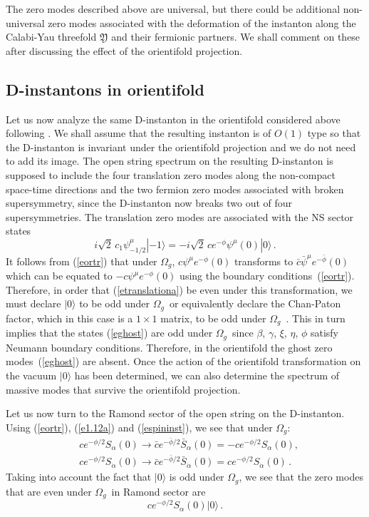 \documentclass[12pt,a4paper]{article}
\newcommand{\be}{\begin{equation}}
\newcommand{\ee}{\end{equation}}
\newcommand{\refb}[1]{(\ref{#1})}
\newcommand{\dalpha}{\beta}
\def\CY{\mathfrak{Y}}
\def\dalpha{{\dot\alpha}}
\newcommand{\oo}{{$\Omega_g$}}
\begin{document}
The zero modes described
above are universal, but there could be additional non-universal zero modes associated with
the deformation of the instanton along the Calabi-Yau threefold $\CY$ and their fermionic partners.
We shall comment on these after discussing the effect of the orientifold projection.

\subsection{D-instantons in orientifold}

Let us now analyze the same D-instanton in the orientifold
considered above
following \cite{Gimon:1996rq,Gaberdiel:1997ia,Gaberdiel:1997mg,Ibanez:2007rs}.
We shall assume that the resulting instanton is of $O(1)$ type
\cite{Blumenhagen:2009qh,Ibanez:2007rs}
so that the D-instanton is invariant under
the orientifold projection and we do not need to add its image.
The open string spectrum on the resulting D-instanton is supposed to include the four translation
zero modes along the non-compact space-time
directions and the two fermion zero modes associated with broken supersymmetry, since the
D-instanton now breaks two out of four supersymmetries. The translation zero modes are
associated with the NS sector states
\be\label{etranslationa}
i\sqrt 2\, c_1 \psi^\mu_{-1/2} |{-1}\rangle=-i\sqrt 2\, ce^{-\phi}\psi^\mu(0)|0\rangle\, .
\ee
It follows from \refb{eortr} that under \oo, $c\psi^\mu e^{-\phi}(0)$ transforms to
$\bar c\bar\psi^\mu e^{-\bar\phi}(0)$ which can be equated to $-c\psi^\mu e^{-\phi}(0)$
using the boundary conditions~\refb{eortr}.
Therefore, in order that \refb{etranslationa} be even under
this transformation, we must declare $|0\rangle$ to be odd under \oo\, or
equivalently declare the Chan-Paton factor, which in this case is a $1\times 1$ matrix,
to be odd under \oo\ \cite{Gaberdiel:1997ia,Gaberdiel:1997mg}.
This in turn implies that the states \refb{eghost} are odd under \oo\ since $\beta$,
$\gamma$, $\xi$, $\eta$, $\phi$ satisfy Neumann boundary conditions.
Therefore, in the orientifold the ghost zero modes~\refb{eghost} are absent.
Once the action of the orientifold transformation on the vacuum $|0\rangle$
has been determined, we can also determine the spectrum of massive modes that survive
the orientifold projection.

Let us now turn to the Ramond sector of the open string on the D-instanton. Using
\refb{eortr}, \refb{e1.12a}
and \refb{espininst}, we see that under \oo:
\be
\begin{split}
& ce^{-\phi/2}S_\alpha(0)\to \bar c e^{-\bar\phi/2}\bar S_\alpha(0)
= -ce^{-\phi/2}S_\alpha(0), \\
& ce^{-\phi/2}S_\dalpha(0)\to \bar c e^{-\bar\phi/2}\bar S_\dalpha(0)
= ce^{-\phi/2}S_\dalpha(0)\, .
\end{split}
\ee
Taking into account the fact that $|0\rangle$ is odd under \oo, we see that
the zero modes that are even under \oo\  in Ramond sector are
\be\label{efermionzero}
ce^{-\phi/2}S_\alpha(0)|0\rangle\, .
\ee
\end{document}
